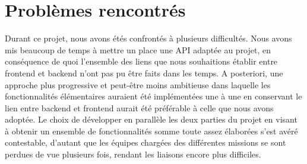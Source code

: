 \documentclass[12pt,twoside,a4paper]{article}
\begin{document}
\section{Probl\`emes rencontr\'es}

Durant ce projet, nous avons \'et\'es confront\'es \`a plusieurs difficult\'es. Nous avons mis beaucoup de temps \`a mettre un place une API adaptée au projet, en cons\'equence de quoi l'ensemble des liens que nous souhaitions établir entre frontend et backend n'ont pas pu être faits dans les temps. A posteriori, une approche plus progressive et peut-être moins ambitieuse dans laquelle les fonctionnalités élémentaires auraient été implémentées une à une en conservant le lien entre backend et frontend aurait été préférable à celle que nous avons adoptée. Le choix de développer en parallèle les deux parties du projet en visant à obtenir un ensemble de fonctionnalités somme toute assez élaborées s'est avéré contestable, d'autant que les équipes chargées des différentes missions se sont perdues de vue plusieurs fois, rendant les liaisons encore plus difficiles.
\end{document}
